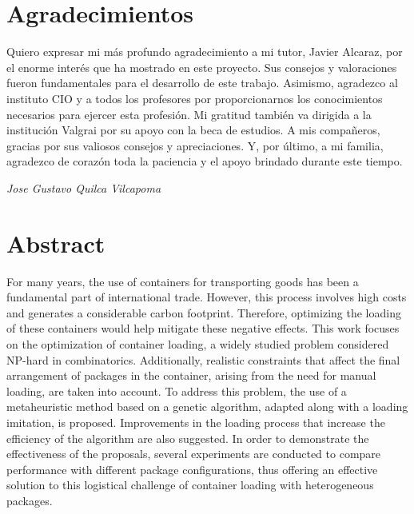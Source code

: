 \documentclass[openany]{article}
\begin{document}
\newpage
\thispagestyle{plain}
\section*{Agradecimientos}

\lipsum[0]
Quiero expresar mi más profundo agradecimiento a mi tutor, Javier Alcaraz, por el enorme interés que ha mostrado en este proyecto. Sus consejos y valoraciones fueron fundamentales para el desarrollo de este trabajo. Asimismo, agradezco al instituto CIO y a todos los profesores por proporcionarnos los conocimientos necesarios para ejercer esta profesión. Mi gratitud también va dirigida a la institución Valgrai por su apoyo con la beca de estudios. A mis compañeros, gracias por sus valiosos consejos y apreciaciones. Y, por último, a mi familia, agradezco de corazón toda la paciencia y el apoyo brindado durante este tiempo.

\mbox{}\par
\vspace{0.5cm}

\begin{flushright}
    \textit{Jose Gustavo Quilca Vilcapoma}
\end{flushright}



\newpage
\thispagestyle{plain}

\section*{Abstract}

For many years, the use of containers for transporting goods has been a fundamental part of international trade. However, this process involves high costs and generates a considerable carbon footprint. Therefore, optimizing the loading of these containers would help mitigate these negative effects. This work focuses on the optimization of container loading, a widely studied problem considered NP-hard in combinatorics. Additionally, realistic constraints that affect the final arrangement of packages in the container, arising from the need for manual loading, are taken into account. To address this problem, the use of a metaheuristic method based on a genetic algorithm, adapted along with a loading imitation, is proposed. Improvements in the loading process that increase the efficiency of the algorithm are also suggested. In order to demonstrate the effectiveness of the proposals, several experiments are conducted to compare performance with different package configurations, thus offering an effective solution to this logistical challenge of container loading with heterogeneous packages.
\end{document}
